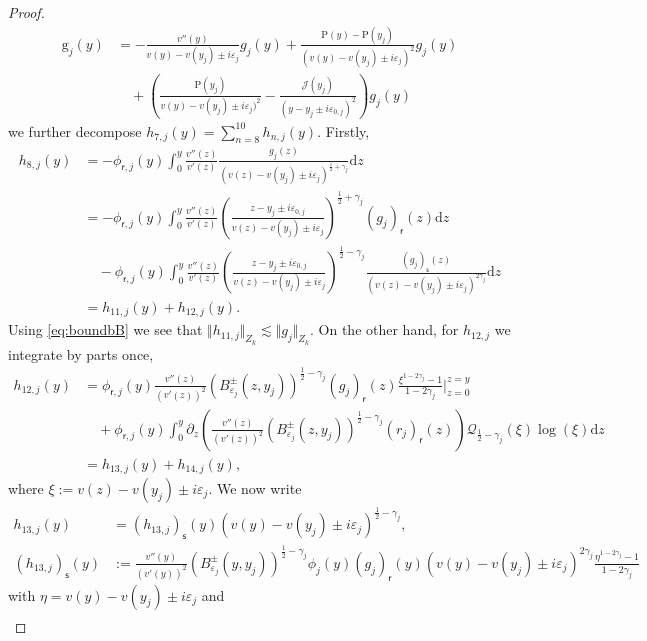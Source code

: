 \documentclass[11pt,reqno]{amsproc}
\theoremstyle{definition}
\numberwithin{equation}{section}
\newcommand{\cJ}{{\mathcal{J}}}
\newcommand{\sr}{{\mathsf{r}}}
\newcommand{\s}{{\mathsf{s}}}
\renewcommand{\d}{\mathrm{d}}
\newcommand{\ep}{\varepsilon}
\begin{document}
\begin{proof}
\begin{align*}
\mathrm{g}_j(y) &= -\frac{v''(y)}{v(y) - v(y_j) \pm i\ep_j}g_j(y) + \frac{\mathrm{P}(y) - \mathrm{P}(y_j)}{(v(y) - v(y_j) \pm i\ep_j)^2}g_j(y) \\
&\quad+\left( \frac{\mathrm{P}(y_j)}{v(y) - v(y_j) \pm i\ep_j)^2} - \frac{\cJ(y_j)}{(y-y_j\pm i\ep_{0,j})^2}\right)g_j(y)
\end{align*}
we further decompose $h_{7,j}(y) = \sum_{n=8}^{10}h_{n,j}(y)$. Firstly,
\begin{align*}
h_{8,j}(y)&=  -\phi_{\sr,j}(y) \int_0^y \frac{v''(z)}{v'(z)}\frac{g_j(z)}{(v(z) - v(y_j) \pm i\ep_j)^{\frac12+\gamma_j}} \d z \\
&= -\phi_{\sr,j}(y)\int_0^y \frac{v''(z)}{v'(z)}\left( \frac{z-y_j\pm i\ep_{0,j}}{v(z) - v(y_j) \pm i\ep_j} \right) ^{\frac12+\gamma_j} (g_j)_{\sr}(z) \d z \\
&\quad -\phi_{\sr,j}(y)\int_0^y \frac{v''(z)}{v'(z)}\left( \frac{z-y_j\pm i\ep_{0,j}}{v(z) - v(y_j) \pm i\ep_j} \right) ^{\frac12-\gamma_j}  \frac{(g_j)_\s(z)}{(v(z) - v(y_j) \pm i\ep_j)^{2\gamma_j}} \d z \\
&= h_{11,j}(y) + h_{12,j}(y).
\end{align*}
Using \eqref{eq:boundbB} we see that $\Vert h_{11,j} \Vert_{Z_k} \lesssim \Vert g_j \Vert_{Z_k}$. On the other hand, for $h_{12,j}$ we integrate by parts once,
\begin{align*}
h_{12,j}(y) &=  \phi_{\sr,j}(y)\frac{v''(z)}{(v'(z))^2}  \left( B_{\ep_j}^\pm(z,y_j) \right) ^{\frac12-\gamma_j} (g_j)_\sr(z) \frac{\xi^{1-2\gamma_j} - 1 }{1-2\gamma_j} \Big|_{z=0}^{z=y} \\
&\quad + \phi_{\sr,j}(y)\int_0^y \partial_ z \left( \frac{v''(z)}{(v'(z))^2}  \left( B_{\ep_j}^\pm(z,y_j) \right) ^{\frac12-\gamma_j} (r_j)_\sr(z)  \right) \mathcal{Q}_{\frac12-\gamma_j}(\xi)\log(\xi) \d z \\
&= h_{13,j}(y) + h_{14,j}(y),
\end{align*}
where $\xi:=v(z) - v(y_j) \pm i\ep_j$. We now write
\begin{align*}
h_{13,j}(y) &= \left(h_{13,j}\right)_\s(y)(v(y) - v(y_j) \pm i\ep_j)^{\frac12-\gamma_j} , \\
\left(h_{13,j}\right)_\s(y) &:= \frac{v''(y)}{(v'(y))^2}\left( B_{\ep_j}^\pm(y,y_j) \right)^{\frac12-\gamma_j} \phi_j(y) (g_j)_\sr(y) (v(y) - v(y_j) \pm i\ep_j)^{2\gamma_j} \frac{\eta^{1-2\gamma_j}-1}{1-2\gamma_j}
\end{align*}
with $\eta = v(y) - v(y_j) \pm i\ep_j$ and
\begin{align*}

\end{align*}
\end{proof}
\end{document}
